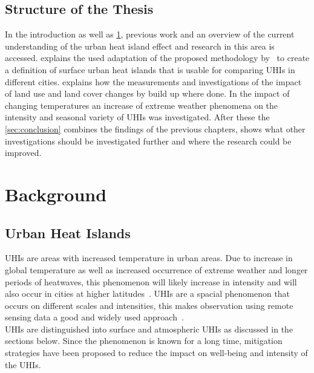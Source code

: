 \documentclass[12pt,a4paper, english,twoside]{article}
\begin{document}
  \subsection{Structure of the Thesis}\label{ssec:structure} 
    In the introduction as well as \cref{sec:background}, previous work and an overview of the current understanding of the urban heat island effect and research in this area is accessed. 
     explains the used adaptation of the proposed methodology by~\cite{Sobrino2020} to create a definition of surface urban heat islands that is usable for comparing \glspl{UHI} in different cities.  
     explains how the measurements  and investigations of the impact of land use and land cover changes by build up where done.
    In  the impact of changing temperatures an increase of extreme weather phenomena on the intensity and seasonal variety of \glspl{UHI} was investigated. 
    After these the \cref{sec:conclusion} combines the findings of the previous chapters, shows what other investigations should be investigated further and where the research could be improved. 
%
\section{Background}\label{sec:background}
  \subsection{Urban Heat Islands}
    \glspl{UHI} are areas with increased temperature in urban areas.
    Due to increase in global temperature as well as increased occurrence of extreme weather and longer periods of heatwaves, this phenomenon will likely increase in intensity and will also occur in cities at higher latitudes~\cite{Sachindra2016}\cite[p.~904]{Wilby2008}.
    \glspl{UHI} are a spacial phenomenon that occurs on different scales and intensities, this makes observation using remote sensing data a good and widely used approach~\cite{Weng2003}.\\
    \glspl{UHI} are distinguished into surface and atmospheric \glspl{UHI} as discussed in the sections below. 
    Since the phenomenon is known for a long time, mitigation strategies have been proposed to reduce the impact on well-being and intensity of the \glspl{UHI}.
%
\end{document}
